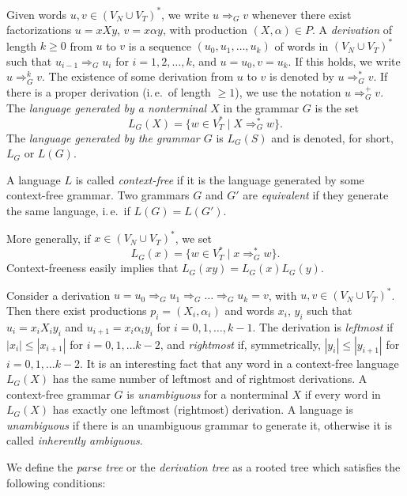 Given words $u, v \in (V_N \cup V_T)^*$, we write $u \Rightarrow_G v$ whenever there exist factorizations $u = x X y$, $v = x \alpha y$, with production $(X, \alpha) \in P$. A \emph{derivation} of length $k \ge 0$ from $u$ to $v$ is a sequence $(u_0, u_1, \ldots, u_k)$ of words in $(V_N \cup V_T)^*$ such that $u_{i-1} \Rightarrow_G u_i$ for $i = 1, 2, \ldots, k$, and $u = u_0, v = u_k$. If this holds, we write $u \Rightarrow^k_G v$. The existence of some derivation from $u$ to $v$ is denoted by $u \Rightarrow^*_G v$. If there is a proper derivation
(i.\,e.\ of length $\ge 1$), we use the notation $u \Rightarrow^+_G v$. The \emph{language generated by a nonterminal $X$} in the grammar $G$ is the set
$$L_G(X) = \{w \in V_T^* \mid X \Rightarrow^*_G w\}.$$
The \emph{language generated by the grammar $G$} is $L_G(S)$ and is denoted, for short, $L_G$ or $L(G)$.

A language $L$ is called \emph{context-free} if it is the language generated by some context-free grammar. Two grammars $G$ and $G'$ are \emph{equivalent} if they generate the same language, i.\,e.\ if $L(G) = L(G')$.

More generally, if $x \in (V_N \cup V_T)^*$, we set
$$L_G(x) = \{w \in V_T^* \mid x \Rightarrow^*_G w\}.$$
Context-freeness easily implies that $L_G(xy) = L_G(x) L_G(y)$.

Consider a derivation $u = u_0 \Rightarrow_G u_1 \Rightarrow_G \ldots \Rightarrow_G u_k = v$, with $u, v \in (V_N \cup V_T)^*$. Then there exist productions $p_i = (X_i, \alpha_i)$ and words $x_i$, $y_i$ such that $u_i = x_i X_i y_i$ and $u_{i+1} = x_i \alpha_i y_i$ for $i = 0, 1, \ldots, k-1$. The derivation is \emph{leftmost} if $|x_i| \le |x_{i+1}|$ for $i = 0, 1, \ldots k-2$, and \emph{rightmost} if, symmetrically, $|y_i| \le |y_{i+1}|$ for $i = 0, 1, \ldots k-2$. It is an interesting fact that any word in a context-free language $L_G(X)$ has the same number of leftmost and of rightmost derivations. A context-free grammar $G$ is \emph{unambiguous} for a nonterminal $X$ if every word in $L_G(X)$ has exactly one leftmost (rightmost) derivation. A language is \emph{unambiguous} if there is an unambiguous grammar to generate it, otherwise it is called \emph{inherently ambiguous}.

We define the \emph{parse tree} or the \emph{derivation tree} as a rooted tree which satisfies the following conditions:

